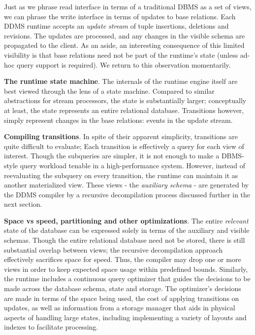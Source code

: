 Just as we phrase read interface in terms of a traditional DBMS as a set of views, we can phrase the write interface in terms of updates to base relations.  Each DDMS runtime accepts an \textit{update stream} of tuple insertions, deletions and revisions.  The updates are processed, and any changes in the visible schema are propagated to the client.  As an aside, an interesting consequence of this limited visibility is that base relations need not be part of the runtime's state (unless ad-hoc query support is required).  We return to this observation momentarily.

{\bf The runtime state machine}\/.
The internals of the runtime engine itself are best viewed through the lens of a state machine.  Compared to similar abstractions for stream processors\cite{demers-sigmod:07}, the state is substantially larger; conceptually at least, the state represents an entire relational database.  Transitions however, simply represent changes in the base relations: events in the update stream.

{\bf Compiling transitions}\/.
In spite of their apparent simplicity, transitions are quite difficult to evaluate; Each transition is effectively a query for each view of interest.  Though the subqueries are simpler, it is not enough to make a DBMS-style query workload tenable in a high-performance system.  However, instead of reevaluating the subquery on every transition, the runtime can maintain it as another materialized view.  These views - the \textit{auxiliary schema} - are generated by the DDMS compiler by a recursive decompilation process discussed further in the next section.

{\bf Space vs speed, partitioning and other optimizations}\/.
The entire \textit{relevant} state of the database can be expressed solely in terms of the auxiliary and visible schemas.  Though the entire relational database need not be stored, there is still substantial overlap between views; the recursive decompilation approach effectively sacrifices space for speed.  Thus, the compiler may drop one or more views in order to keep expected space usage within predefined bounds.  Similarly, the runtime includes a continuous query optimizer that guides the decisions to be made across the database schema, state and storage.  The optimizer's decisions are made in terms of the space being used, the cost of applying transitions on updates, as well as information from a storage manager that aids in physical aspects of handling large states, including implementing a variety of layouts and indexes to facilitate processing.\